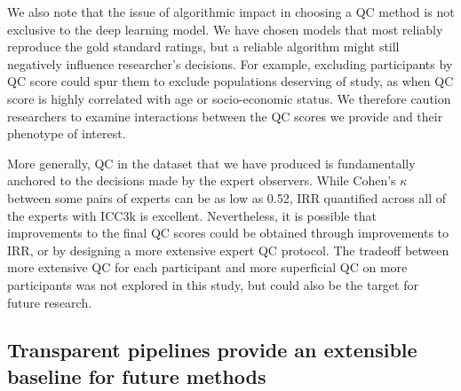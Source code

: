 \documentclass[fleqn,10pt,inline]{wlscirep}
\begin{document}
We also note that the issue of algorithmic impact in choosing a QC method is not
exclusive to the deep learning model. We have chosen models that most reliably
reproduce the gold standard ratings, but a reliable algorithm might still
negatively influence researcher's decisions. For example, excluding participants
by QC score could spur them to exclude populations deserving of study, as when
QC score is highly correlated with age or socio-economic status. We therefore
caution researchers to examine interactions between the QC scores we provide and
their phenotype of interest.

More generally, QC in the dataset that we have produced is fundamentally
anchored to the decisions made by the expert observers. While Cohen's $\kappa$
between some pairs of experts can be as low as 0.52, IRR quantified across all
of the experts with ICC3k is excellent. Nevertheless, it is possible that
improvements to the final QC scores could be obtained through improvements to
IRR, or by designing a more extensive expert QC protocol. The tradeoff between
more extensive QC for each participant and more superficial QC on more participants was
not explored in this study, but could also be the target for future research.


\subsection*{Transparent pipelines provide an extensible baseline for future methods}
\end{document}
